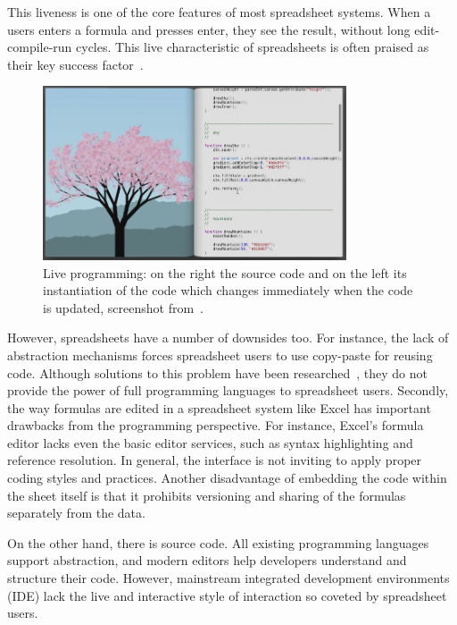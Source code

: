 \documentclass{llncs}
\newcommand{\todo}[1]{\textbf{#1}}
\begin{document}
This liveness is one of the core features of most spreadsheet systems. When a users enters a formula and presses enter, they see the result, without long edit-compile-run cycles. This live characteristic of spreadsheets is often praised as their key success factor~\cite{proof}.
\begin{figure}
  \begin{center}
  \includegraphics[width=9cm]{fig/bret.png}
  \caption{Live programming: on the right the source code and on the left its instantiation of the code which changes immediately when the code is updated, screenshot from~\cite{Victor2012}.}
  \label{fig:bret}
  \end{center}
\end{figure} 
However, spreadsheets have a number of downsides too. For instance, the lack of  abstraction mechanisms forces spreadsheet users to use copy-paste for reusing code. Although solutions to this problem have been researched~\cite{hermans_2015_19341,jones2003user}, they do not provide the power of full programming languages to spreadsheet users. Secondly, the way formulas are edited in a spreadsheet system like Excel has important drawbacks from the programming perspective. For instance, Excel's formula editor lacks even the basic editor services, such as  syntax highlighting and reference resolution.  In general, the interface is not inviting to apply proper coding styles and practices. Another disadvantage of embedding the code within the sheet itself is that it prohibits versioning and sharing of the formulas separately from the data. 

On the other hand, there is source code. All existing programming languages support abstraction, and modern editors help developers understand and structure their code. However, mainstream integrated development environments (IDE) lack the live and interactive style of interaction so coveted by spreadsheet users.
\end{document}
